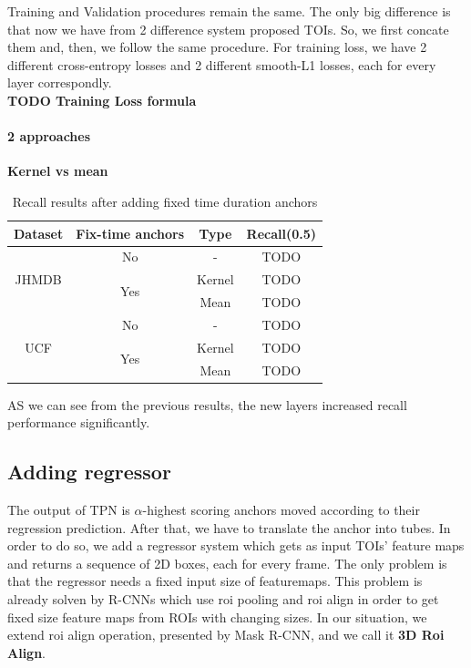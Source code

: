\documentclass{report}
\begin{document}
Training and Validation procedures remain the same. The only big difference is that now we have from 2 difference system proposed TOIs. So, we first concate
them and, then, we follow the same procedure. For training loss, we have 2 different cross-entropy losses and 2 different smooth-L1 losses, each for every
layer correspondly. \\

\textbf{TODO Training Loss formula}

\paragraph {2 approaches}

\textbf{Kernel vs mean}

\begin{table}[h]
  \centering
  \begin{tabular}{||c | c | c | c ||}
    \hline
    \textbf{Dataset} & \textbf{Fix-time anchors} & \textbf{Type} & \textbf{Recall(0.5)} \\
    \hline  \hline
    \multirow{3}{4em}{JHMDB} & No &  - & TODO \\
    \cline{2-4}
    {} & \multirow{2}{*}{Yes} & Kernel & TODO \\
    \cline{3-4}
    {} & {} & Mean & TODO \\
    \hline
    \multirow{3}{4em}{UCF} & No & - & TODO \\
    \cline{2-4}
    {} & \multirow{2}{*}{Yes} & Kernel & TODO \\
    \cline{3-4}
    {} & {} & Mean & TODO \\
    \hline      
  \end{tabular}
  \caption{Recall results after adding fixed time duration anchors}
  \label{table:add_16}
\end{table}

AS we can see from the previous results, the new layers increased recall performance significantly.

\subsection{Adding regressor}
The output of TPN is $\alpha$-highest scoring anchors moved according to their regression prediction. After that, we have to translate the anchor into tubes.
In order to do so, we add a regressor system which gets as input TOIs' feature maps and returns a sequence of 2D boxes, each for every frame.
The only problem is that the regressor needs a fixed input size of featuremaps. This problem is already solven by R-CNNs which use roi pooling and roi align
in order to get fixed size feature maps from ROIs with changing sizes. In our situation, we extend roi align operation, presented by Mask R-CNN, and we
call it \textbf{3D Roi Align}.
\end{document}
